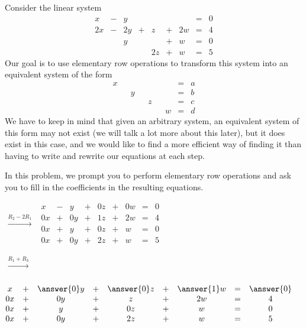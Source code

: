 \documentclass{ximera}
\begin{document}
\begin{exploration}\label{init:augmentedmatrixex}
Consider the linear system
\begin{equation}\label{eq:sys20originalsystem1}
\begin{array}{ccccccccc}
      x &- &y&&&&&= &0 \\
	 2x& -&2y&+&z&+&2w&=&4\\
     & &y&&&+&w&=&0\\
     & &&&2z&+&w&=&5
    \end{array}
    \end{equation}
Our goal is to use elementary row operations to transform this system into an equivalent system of the form
\begin{equation}\begin{array}{ccccccccc}
      x & &&&&&&= &a \\
	 & &y&&&&&=&b\\
     & &&&z&&&=&c\\
     & &&&&&w&=&d
    \end{array}
    \end{equation}
 We have to keep in mind that given an arbitrary system, an equivalent system of this form may not exist (we will talk a lot more about this later), but it does exist in this case, and we would like to find a more efficient way of finding it than having to write and rewrite our equations at each step.   
 
In this problem, we prompt you to perform elementary row operations and ask you to fill in the coefficients in the resulting equations.
\begin{center} 
$\begin{array}{c}
 \\
 \xrightarrow{R_2-2R_1}\\
\\
\\
 \end{array}$
$\begin{matrix}
      x &- &y&+&0z&+&0w&= &0 \\
	 0x& +&0y&+& 1z&+& 2w&=& 4\\
     0x& +&y&+&0z&+&w&=&0\\
     0x&+&0y&+&2z&+&w&=&5
    \end{matrix}$
    
 $\begin{array}{c}
 \xrightarrow{R_1+R_3}\\
\\
\\
\\
 \end{array}$
$\begin{matrix}
      x &+ & \answer{0}y&+&\answer{0}z&+& \answer{1}w&= & \answer{0} \\
	 0x& +&0y&+&z&+&2w&=&4\\
     0x& +&y&+&0z&+&w&=&0\\
     0x&+&0y&+&2z&+&w&=&5
    \end{matrix}$
 


\end{center}
\end{exploration}
\end{document}
